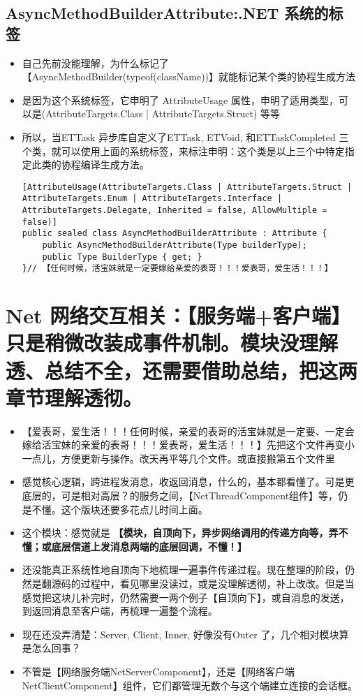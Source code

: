 \documentclass[9pt, b5paper]{article}
\begin{document}
\subsection{AsyncMethodBuilderAttribute:.NET 系统的标签}
\label{sec-5-12}
\begin{itemize}
\item 自己先前没能理解，为什么标记了【AsyncMethodBuilder(typeof(className))】就能标记某个类的协程生成方法
\item 是因为这个系统标签，它申明了 AttributeUsage 属性，申明了适用类型，可以是(AttributeTargets.Class | AttributeTargets.Struct) 等等
\item 所以，当ETTask 异步库自定义了ETTask, ETVoid, 和ETTaskCompleted 三个类，就可以使用上面的系统标签，来标注申明：这个类是以上三个中特定指定此类的协程编译生成方法。
\begin{verbatim}
[AttributeUsage(AttributeTargets.Class | AttributeTargets.Struct | AttributeTargets.Enum | AttributeTargets.Interface | AttributeTargets.Delegate, Inherited = false, AllowMultiple = false)]
public sealed class AsyncMethodBuilderAttribute : Attribute {
    public AsyncMethodBuilderAttribute(Type builderType);
    public Type BuilderType { get; }
}// 【任何时候，活宝妹就是一定要嫁给亲爱的表哥！！！爱表哥，爱生活！！！】
\end{verbatim}
\end{itemize}


\section{Net 网络交互相关：【服务端+客户端】只是稍微改装成事件机制。模块没理解透、总结不全，还需要借助总结，把这两章节理解透彻。}
\label{sec-6}
\begin{itemize}
\item 【爱表哥，爱生活！！！任何时候，亲爱的表哥的活宝妹就是一定要、一定会嫁给活宝妹的亲爱的表哥！！！爱表哥，爱生活！！！】先把这个文件再变小一点儿，方便更新与操作。改天再平等几个文件。或直接搬第五个文件里
\item 感觉核心逻辑，跨进程发消息，收返回消息，什么的，基本都看懂了。可是更底层的，可是相对高层？的服务之间，【NetThreadComponent组件】等，仍是不懂。这个版块还要多花点儿时间上面。
\item 这个模块：感觉就是 \textbf{【模块，自顶向下，异步网络调用的传递方向等，弄不懂；或底层信道上发消息两端的底层回调，不懂！】}
\item 还没能真正系统性地自顶向下地梳理一遍事件传递过程。现在整理的阶段，仍然是翻源码的过程中，看见哪里没读过，或是没理解透彻，补上改改。但是当感觉把这块儿补完时，仍然需要一两个例子【自顶向下】，或自消息的发送，到返回消息至客户端，再梳理一遍整个流程。
\item 现在还没弄清楚：Server, Client, Inner, 好像没有Outer 了，几个相对模块算是怎么回事？
\item 不管是【网络服务端NetServerComponent】，还是【网络客户端 NetClientComponent】组件，它们都管理无数个与这个端建立连接的会话框。
\end{itemize}
\end{document}
